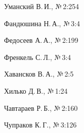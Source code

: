 \begin{theindex}
\newpage















\item Уманский В.\,И., №\,2:254


\vspace*{3pt}





  \indexspace





\item Фандюшина Н.\,А., №\,3:4


\item Федосеев А.\,А., №\,2:199


\item Френкель С.\,Л., №\,3:4





\vspace*{3pt}





  \indexspace





\item Хавансков В.\,А., №\,2:5


\item Хилько Д.\,В., №\,1:24





  \indexspace


  


  \vspace*{3pt}





\item Чавтараев Р.\,Б., №\,2:160


\item Чупраков К.\,Г., №\,3:126





  \indexspace



\end{theindex}
